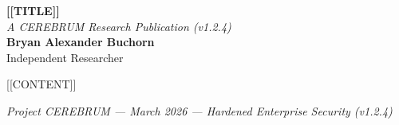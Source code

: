 \documentclass[11pt,article,oneside]{memoir}
\begin{document}
\begin{center}
    \Huge \textbf{[[TITLE]]} \\
    \vspace{0.5em}
    \large \textit{A CEREBRUM Research Publication (v1.2.4)} \\
    \vspace{1em}
    \large \textbf{Bryan Alexander Buchorn} \\
    Independent Researcher \\
    \vspace{2em}
\end{center}

\begin{abstract}
\textbf{Overview:} This guide provides a conceptual entry point into the CEREBRUM framework. It is designed for practitioners and researchers seeking to understand the core reasoning signals of [[SUBTITLE]].
\end{abstract}

[[CONTENT]]

\vspace{3em}
\begin{center}
    \small \textit{Project CEREBRUM — March 2026 — Hardened Enterprise Security (v1.2.4)}
\end{center}
\end{document}
